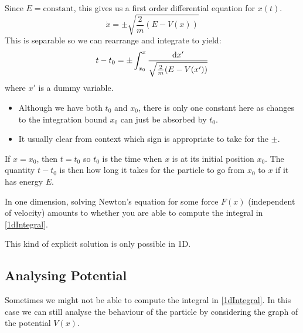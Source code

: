 \documentclass[../main.tex]{subfiles}
\begin{document}
Since $E = \text{constant}$, this gives us a first order differential equation for $x(t)$.
\[
  \dot{x} = \pm \sqrt{\frac{2}{m}(E - V(x))}
\]
This is separable so we can rearrange and integrate to yield:
\begin{equation}
  t - t_0 = \pm \int_{x_0}^{x} \frac{\d{x'}}{\sqrt{\frac{2}{m}(E - V(x'))}} \label{1dIntegral}
\end{equation}
where $x'$ is a dummy variable.
\begin{remark}
  \begin{itemize}
    \item Although we have both $t_0$ and $x_0$, there is only one constant here as changes to the integration bound $x_0$ can just be absorbed by $t_0$.
    \item It usually clear from context which sign is appropriate to take for the $\pm$.
  \end{itemize}
\end{remark}
If $x = x_0$, then $t = t_0$ so $t_0$ is the time when $x$ is at its initial position $x_0$.
The quantity $t - t_0$ is then how long it takes for the particle to go from $x_0$ to $x$ if it has energy $E$.

\begin{remark}[Summary]
  In one dimension, solving Newton's equation for some force $F(x)$ (independent of velocity) amounts to whether you are able to compute the integral in \cref{1dIntegral}.

  This kind of explicit solution is only possible in 1D.
\end{remark}
\subsection{Analysing Potential}
Sometimes we might not be able to compute the integral in \cref{1dIntegral}.
In this case we can still analyse the behaviour of the particle by considering the graph of the potential $V(x)$.
\end{document}
